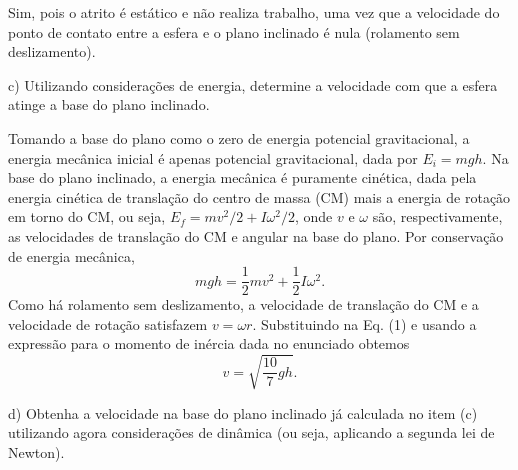\begin{enumerate}[start=1,label={\bfseries Q\arabic*.}]
\resposta Sim, pois o atrito é estático e não realiza trabalho, uma vez que a velocidade do ponto de contato entre a esfera e o plano inclinado é nula (rolamento sem deslizamento).

c) Utilizando considerações de energia, determine a velocidade com que a esfera atinge a base do plano inclinado.

\resposta Tomando a base do plano como o zero de energia potencial gravitacional, a energia mecânica inicial é apenas potencial gravitacional, dada por $E_{i} = mgh$. Na base do plano inclinado, a energia mecânica é puramente cinética, dada pela energia cinética de translação do centro de massa (CM) mais a energia de rotação em torno do CM, ou seja, $E_{f} = mv^{2}/2 + I \omega^{2}/2$, onde $v$ e $\omega$ são, respectivamente, as velocidades de translação do CM e angular na base do plano. Por conservação de energia mecânica,
%
\begin{equation}
  mgh = \frac{1}{2} m v^{2} + \frac{1}{2} I \omega^{2} .
\end{equation}
%
Como há rolamento sem deslizamento, a velocidade de translação do CM e a velocidade de rotação satisfazem $v = \omega r$. Substituindo na Eq. (1) e usando a expressão para o momento de inércia dada no enunciado obtemos
%
\begin{equation}
  v = \sqrt{\frac{10}{7} gh }  .
\end{equation}
%


d) Obtenha a velocidade na base do plano inclinado já calculada no item (c) utilizando agora considerações de dinâmica (ou seja, aplicando a segunda lei de Newton).


\end{enumerate}
